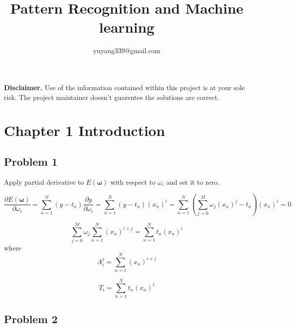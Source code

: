 \documentclass{article}
\author{yuyang339@gmail.com}
\title{Pattern Recognition and Machine learning}
\date{}
\begin{document}
\maketitle

\textbf{Disclaimer.} Use of the information contained within this project is at your sole risk. The project maintainer doesn't guarentee the solutions are correct.

\section*{Chapter 1 Introduction}
\subsection*{Problem 1}
\begin{flushleft}
Apply partial derivative to $E(\boldsymbol{\omega})$ with respect to $\omega_{i}$ and set it to zero.

\begin{equation}
\frac{\partial E(\boldsymbol{\omega})}{\partial \omega_{i}} = \sum_{n=1}^{N}{(y-t_{n})}\frac{\partial y}{\partial \omega_{i}} = \sum_{n=1}^{N}{(y-t_{n})}(x_{n})^i =\sum_{n=1}^{N}{(\sum_{j=0}^{M}\omega_{j}(x_{n})^{j}-t_{n})}(x_{n})^i = 0
\end{equation}

\begin{equation}
\sum_{j=0}^{M}\omega_{j}\sum_{n=1}^{N}{(x_{n})^{i+j}= \sum_{n=1}^{N}t_{n}}(x_{n})^i 
\end{equation}
where
\begin{equation}
A_{i}^{j} = \sum_{n=1}^{N}{(x_{n})^{i+j}}
\end{equation}

\begin{equation}
T_{i} = \sum_{n=1}^{N}t_{n}(x_{n})^i
\end{equation}

\subsection*{Problem 2}

\end{flushleft}
\end{document}
